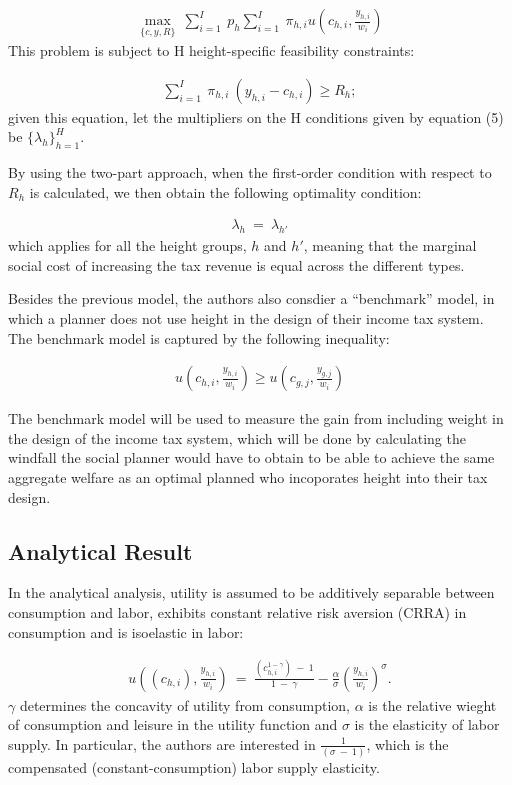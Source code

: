 \documentclass[titlepage]{\econtex}
\begin{document}
  \begin{align}
   \max_{\{c,y,R\}}~ \sum_{i=1}^I \ p_{h} \sum_{i=1}^I \ \pi_{h,i} u\left(c_{h,i}, \frac{y_{h,i}}{w_i}\right)
 \end{align}
 This problem is subject to H height-specific feasibility constraints:

   \begin{align}
    \sum_{i=1}^I \ \pi_{h,i} \ (y_{h,i} - c_{h,i}) \geq R_h ;
 \end{align}
 given this equation, let the multipliers on the H conditions given by equation (5) be $\{\lambda_h\}_{h=1}^H$.

 By using the two-part approach, when the first-order condition with respect to $R_h$ is calculated, we then obtain the following optimality condition:

   \begin{align}
    \lambda_h \ = \ \lambda_{h'}
   \end{align} 
   which applies for all the height groups, $h$ and $h'$, meaning that the marginal social cost of increasing the tax revenue is equal across the different types.

   Besides the previous model, the authors also consdier a ``benchmark'' model, in which a planner does not use height in the design of their income tax system. The benchmark model is captured by the following inequality:

    \begin{align}
     u\left(c_{h,i}, \frac{y_{h,i}}{w_i}\right) \geq u\left(c_{g,j}, \frac{y_{g,j}}{w_i}\right)
    \end{align}

    The benchmark model will be used to measure the gain from including weight in the design of the income tax system, which will be done by calculating the windfall the social planner would have to obtain to be able to achieve the same aggregate welfare as an optimal planned who incoporates height into their tax design.
 
\hypertarget{Analytical Result}{}
\subsection{Analytical Result}

In the analytical analysis, utility is assumed to be additively separable between consumption and labor, exhibits constant relative risk aversion (CRRA) in consumption and is isoelastic in labor:

   \begin{align}
  u\left((c_{h,i}), \frac{y_{h,i}}{w_i}\right) \ = \ \frac{(c_{h,i}^{1-\gamma}) \ - \ 1}{1 \ - \ \gamma} - \frac{\alpha}{\sigma} \left(\frac{y_{h,i}}{w_i}\right)^\sigma.
   \end{align}
$\gamma$ determines the concavity of utility from consumption,  $\alpha$ is the relative wieght of consumption and leisure in the utility function and $\sigma$ is the elasticity of labor supply. In particular, the authors are interested in $\frac{1}{(\sigma \ - \ 1)}$, which is the compensated (constant-consumption) labor supply elasticity.
\end{document}
